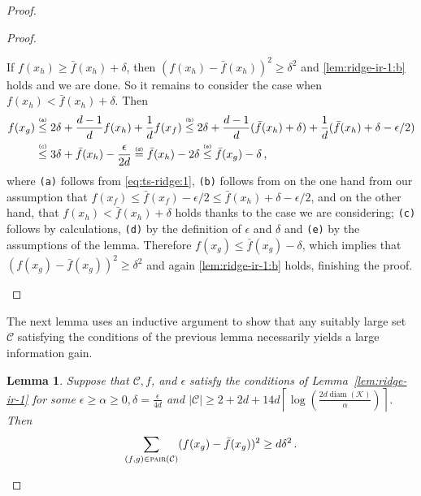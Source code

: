 \documentclass[letter, 12pt]{report}
\newcommand{\ceil}[1]{\left\lceil #1 \right\rceil}
\newcommand{\pair}{\operatorname{\textsc{pair}}}
\newcommand{\explan}[1]{\stackrel{\text{\tiny \texttt{#1}}}}
\newcommand{\cK}{\mathcal K}
\newcommand{\cC}{\mathcal C}
\newcommand{\diam}{\operatorname{diam}}
\newcommand{\1}{\mathbf{1}}
\theoremstyle{plain}
\newtheorem{lemma}[theorem]{Lemma}
\theoremstyle{definition}
\theoremstyle{remark}
\begin{document}
\begin{proof}
\begin{proof}
\begin{enumcases}
            If $f(x_h) \geq \bar f(x_h) + \delta$, then $(f(x_h) - \bar f(x_h))^2 \geq \delta^2$ and \ref{lem:ridge-ir-1:b} holds and we are done.
            So it remains to consider the case when $f(x_h) < \bar f(x_h) + \delta$.
            Then
            \begin{align*}
                f(x_g)
                 & \explan{(a)}\leq 2 \delta + \frac{d-1}{d} f(x_h) + \frac{1}{d} f(x_f)
                \explan{(b)}\leq 2 \delta + \frac{d-1}{d} (\bar f(x_h) + \delta) + \frac{1}{d} (\bar f(x_h) + \delta - \epsilon / 2) \\
                 & \explan{(c)}\leq 3 \delta + \bar f(x_h) - \frac{\epsilon}{2d}
                \explan{(d)}= \bar f(x_h) - 2\delta
                \explan{(e)}\leq \bar f(x_g) - \delta \,,
            \end{align*}
            where \texttt{(a)} follows from \cref{eq:ts-ridge:1},
            \texttt{(b)} follows from on the one hand from our assumption that
            $f(x_f) \leq \bar f(x_f) - \epsilon/2 \leq \bar f(x_h) + \delta - \epsilon/2$, and on the other hand, that $f(x_h) < \bar f(x_h) + \delta$ holds thanks to the case we are considering;
            \texttt{(c)} follows by calculations,
            \texttt{(d)} by the definition of $\epsilon$ and $\delta$
            and \texttt{(e)} by the assumptions of the lemma.
            Therefore $f(x_g) \leq \bar f(x_g) - \delta$,
            which implies that $(f(x_g) - \bar f(x_g))^2 \geq \delta^2$ and again \ref{lem:ridge-ir-1:b} holds, finishing the proof.
        \end{enumcases}
    \end{proof}

    The next lemma uses an inductive argument to show that any suitably large set $\cC$ satisfying the conditions of the previous lemma necessarily
    yields a large information gain.

    \begin{lemma}\label{lem:ridge-ir-2}
        Suppose that $\cC, f$, and $\epsilon$ satisfy the conditions of Lemma~\ref{lem:ridge-ir-1} for some $\epsilon \geq \alpha \geq 0, \delta = \tfrac{\epsilon}{4d}$ and $|\cC| \geq 2 + 2d + 14 d \ceil{\log\left(\frac{2d \diam(\cK)}{\alpha}\right)}$.
        Then
        \begin{align*}
            \sum_{(f,g) \in \pair(\cC)} (f(x_g) - \bar f(x_g))^2 \geq d \delta^2 \,.
        \end{align*}
    \end{lemma}


\end{proof}
\end{document}
